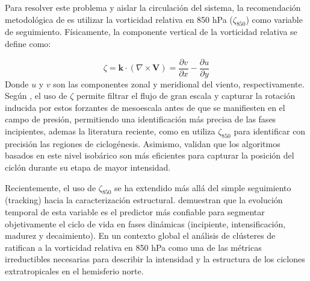 Para resolver este problema y aislar la circulación del sistema, la recomendación metodológica de \citet{sinclair1997objective} es utilizar la vorticidad relativa en 850 hPa ($\zeta_{850}$) como variable de seguimiento. Físicamente, la componente vertical de la vorticidad relativa se define como:

\begin{equation}
\zeta = \mathbf{k} \cdot (\nabla \times \mathbf{V}) = \frac{\partial v}{\partial x} - \frac{\partial u}{\partial y}
\end{equation}
%
Donde $u$ y $v$ son las componentes zonal y meridional del viento, respectivamente. Según \citet{hoskins2005new}, el uso de $\zeta$ permite filtrar el flujo de gran escala y capturar la rotación inducida por estos forzantes de mesoescala antes de que se manifiesten en el campo de presión, permitiendo una identificación más precisa de las fases incipientes, ademas la literatura reciente, como en \citet{gramcianinov2019properties} utiliza $\zeta_{850}$ para identificar con precisión las regiones de ciclogénesis. Asimismo, \citet{padilhareinke2024objective} validan que los algoritmos basados en este nivel isobárico son más eficientes para capturar la posición del ciclón durante su etapa de mayor intensidad. 

Recientemente, el uso de $\zeta_{850}$ se ha extendido más allá del simple seguimiento (tracking) hacia la caracterización estructural. \citet{coutodesouza2024new} demuestran que la evolución temporal de esta variable es el predictor más confiable para segmentar objetivamente el ciclo de vida en fases dinámicas (incipiente, intensificación, madurez y decaimiento). En un contexto global el análisis de clústeres de \citet{corner2025classification} ratifican a la vorticidad relativa en 850 hPa como una de las métricas irreductibles necesarias para describir la intensidad y la estructura de los ciclones extratropicales en el hemisferio norte.

